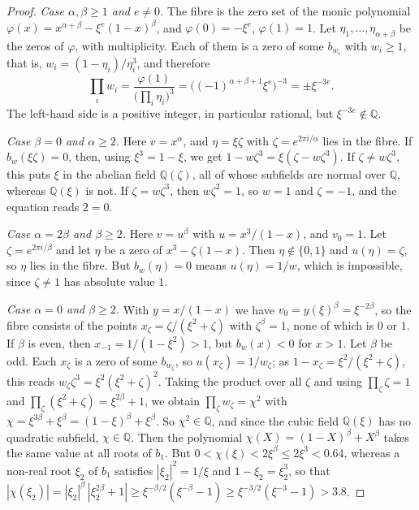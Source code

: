 \documentclass[11pt]{amsart}
\theoremstyle{definition}
\newcommand{\Q}{\mathbb{Q}}
\begin{document}
\begin{proof}
\emph{Case $\alpha,\beta\ge1$ and $e\ne0$.} The fibre is the zero set of the monic polynomial $\varphi(x)=x^{\alpha+\beta}-\xi^e(1-x)^\beta$, and $\varphi(0)=-\xi^e$, $\varphi(1)=1$. Let $\eta_1,\dots,\eta_{\alpha+\beta}$ be the zeros of $\varphi$, with multiplicity. Each of them is a zero of some $b_{w_i}$ with $w_i\ge1$, that is, $w_i=(1-\eta_i)/\eta_i^3$, and therefore
\[
  \prod_iw_i=\frac{\varphi(1)}{\bigl(\prod_i\eta_i\bigr)^3}=\bigl((-1)^{\alpha+\beta+1}\xi^{e}\bigr)^{-3}=\pm\xi^{-3e}.
\]
The left-hand side is a positive integer, in particular rational, but $\xi^{-3e}\notin\Q$.

\emph{Case $\beta=0$ and $\alpha\ge2$.} Here $v=x^\alpha$, and $\eta=\xi\zeta$ with $\zeta=e^{2\pi i/\alpha}$ lies in the fibre. If $b_w(\xi\zeta)=0$, then, using $\xi^3=1-\xi$, we get $1-w\zeta^3=\xi(\zeta-w\zeta^3)$. If $\zeta\ne w\zeta^3$, this puts $\xi$ in the abelian field $\Q(\zeta)$, all of whose subfields are normal over $\Q$, whereas $\Q(\xi)$ is not. If $\zeta=w\zeta^3$, then $w\zeta^2=1$, so $w=1$ and $\zeta=-1$, and the equation reads $2=0$.

\emph{Case $\alpha=2\beta$ and $\beta\ge2$.} Here $v=u^\beta$ with $u=x^3/(1-x)$, and $v_0=1$. Let $\zeta=e^{2\pi i/\beta}$ and let $\eta$ be a zero of $x^3-\zeta(1-x)$. Then $\eta\notin\{0,1\}$ and $u(\eta)=\zeta$, so $\eta$ lies in the fibre. But $b_w(\eta)=0$ means $u(\eta)=1/w$, which is impossible, since $\zeta\ne1$ has absolute value $1$.

\emph{Case $\alpha=0$ and $\beta\ge2$.} With $y=x/(1-x)$ we have $v_0=y(\xi)^\beta=\xi^{-2\beta}$, so the fibre consists of the points $x_\zeta=\zeta/(\xi^2+\zeta)$ with $\zeta^\beta=1$, none of which is $0$ or $1$. If $\beta$ is even, then $x_{-1}=1/(1-\xi^2)>1$, but $b_w(x)<0$ for $x>1$. Let $\beta$ be odd. Each $x_\zeta$ is a zero of some $b_{w_\zeta}$, so $u(x_\zeta)=1/w_\zeta$; as $1-x_\zeta=\xi^2/(\xi^2+\zeta)$, this reads $w_\zeta\zeta^3=\xi^2(\xi^2+\zeta)^2$. Taking the product over all $\zeta$ and using $\prod_\zeta\zeta=1$ and $\prod_\zeta(\xi^2+\zeta)=\xi^{2\beta}+1$, we obtain $\prod_\zeta w_\zeta=\chi^2$ with $\chi=\xi^{3\beta}+\xi^\beta=(1-\xi)^\beta+\xi^\beta$. So $\chi^2\in\Q$, and since the cubic field $\Q(\xi)$ has no quadratic subfield, $\chi\in\Q$. Then the polynomial $\chi(X)=(1-X)^\beta+X^\beta$ takes the same value at all roots of $b_1$. But $0<\chi(\xi)<2\xi^\beta\le2\xi^3<0.64$, whereas a non-real root $\xi_2$ of $b_1$ satisfies $|\xi_2|^2=1/\xi$ and $1-\xi_2=\xi_2^3$, so that $|\chi(\xi_2)|=|\xi_2|^\beta\,|\xi_2^{2\beta}+1|\ge\xi^{-\beta/2}(\xi^{-\beta}-1)\ge\xi^{-3/2}(\xi^{-3}-1)>3.8$.
\end{proof}
\end{document}
